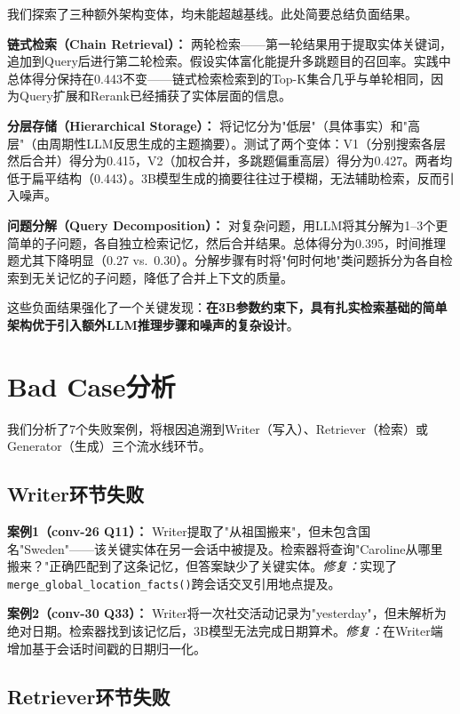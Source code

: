 \documentclass[11pt,a4paper]{ctexart}
\begin{document}
我们探索了三种额外架构变体，均未能超越基线。此处简要总结负面结果。

\textbf{链式检索（Chain Retrieval）：} 两轮检索——第一轮结果用于提取实体关键词，追加到Query后进行第二轮检索。假设实体富化能提升多跳题目的召回率。实践中总体得分保持在0.443不变——链式检索检索到的Top-K集合几乎与单轮相同，因为Query扩展和Rerank已经捕获了实体层面的信息。

\textbf{分层存储（Hierarchical Storage）：} 将记忆分为"低层"（具体事实）和"高层"（由周期性LLM反思生成的主题摘要）。测试了两个变体：V1（分别搜索各层然后合并）得分为0.415，V2（加权合并，多跳题偏重高层）得分为0.427。两者均低于扁平结构（0.443）。3B模型生成的摘要往往过于模糊，无法辅助检索，反而引入噪声。

\textbf{问题分解（Query Decomposition）：} 对复杂问题，用LLM将其分解为1--3个更简单的子问题，各自独立检索记忆，然后合并结果。总体得分为0.395，时间推理题尤其下降明显（0.27 vs.\ 0.30）。分解步骤有时将"何时何地"类问题拆分为各自检索到无关记忆的子问题，降低了合并上下文的质量。

这些负面结果强化了一个关键发现：\textbf{在3B参数约束下，具有扎实检索基础的简单架构优于引入额外LLM推理步骤和噪声的复杂设计}。

\section{Bad Case分析}

我们分析了7个失败案例，将根因追溯到Writer（写入）、Retriever（检索）或Generator（生成）三个流水线环节。

\subsection{Writer环节失败}

\textbf{案例1（conv-26 Q11）：} Writer提取了"从祖国搬来"，但未包含国名"Sweden"——该关键实体在另一会话中被提及。检索器将查询"Caroline从哪里搬来？"正确匹配到了这条记忆，但答案缺少了关键实体。\emph{修复：}实现了\texttt{merge\_global\_location\_facts()}跨会话交叉引用地点提及。

\textbf{案例2（conv-30 Q33）：} Writer将一次社交活动记录为"yesterday"，但未解析为绝对日期。检索器找到该记忆后，3B模型无法完成日期算术。\emph{修复：}在Writer端增加基于会话时间戳的日期归一化。

\subsection{Retriever环节失败}
\end{document}
